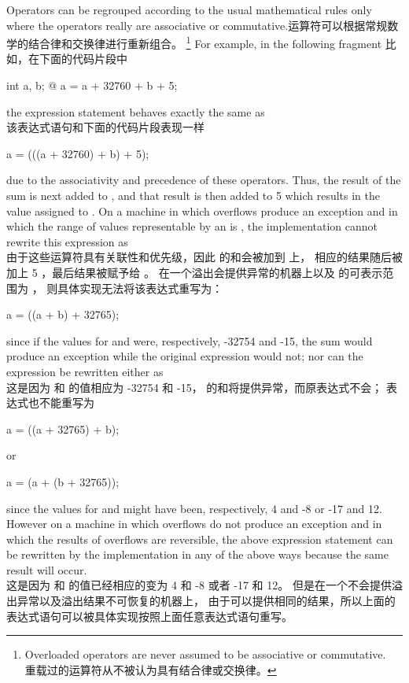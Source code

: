 \pnum
{}%
%
\begin{note} Operators can be regrouped according to the usual
mathematical rules only where the operators really are associative or
commutative.运算符可以根据常规数学的结合律和交换律进行重新组合。
\footnote{Overloaded operators are never assumed to be associative or
commutative.\\
重载过的运算符从不被认为具有结合律或交换律。
}
For example, in the following fragment 比如，在下面的代码片段中
\begin{codeblock}
int a, b;
@\commentellip@
a = a + 32760 + b + 5;
\end{codeblock}
the expression statement behaves exactly the same as \\
该表达式语句和下面的代码片段表现一样
\begin{codeblock}
a = (((a + 32760) + b) + 5);
\end{codeblock}
due to the associativity and precedence of these operators. Thus, the
result of the sum  is next added to , and
that result is then added to 5 which results in the value assigned to
. On a machine in which overflows produce an exception and in
which the range of values representable by an  is
, the implementation cannot rewrite this
expression as \\
由于这些运算符具有关联性和优先级，因此  的和会被加到  上，
相应的结果随后被加上 5 ，最后结果被赋予给 。
在一个溢出会提供异常的机器上以及  的可表示范围为 ，
则具体实现无法将该表达式重写为：
\begin{codeblock}
a = ((a + b) + 32765);
\end{codeblock}
since if the values for  and  were, respectively,
-32754 and -15, the sum  would produce an exception while
the original expression would not; nor can the expression be rewritten
either as \\
这是因为  和  的值相应为 -32754 和 -15， 的和将提供异常，而原表达式不会；
表达式也不能重写为
\begin{codeblock}
a = ((a + 32765) + b);
\end{codeblock}
or
\begin{codeblock}
a = (a + (b + 32765));
\end{codeblock}
since the values for  and  might have been,
respectively, 4 and -8 or -17 and 12. However on a machine in which
overflows do not produce an exception and in which the results of
overflows are reversible, the above expression statement can be
rewritten by the implementation in any of the above ways because the
same result will occur. \\
这是因为  和  的值已经相应的变为 4 和 -8 或者 -17 和 12。
但是在一个不会提供溢出异常以及溢出结果不可恢复的机器上，
由于可以提供相同的结果，所以上面的表达式语句可以被具体实现按照上面任意表达式语句重写。
\end{note}

